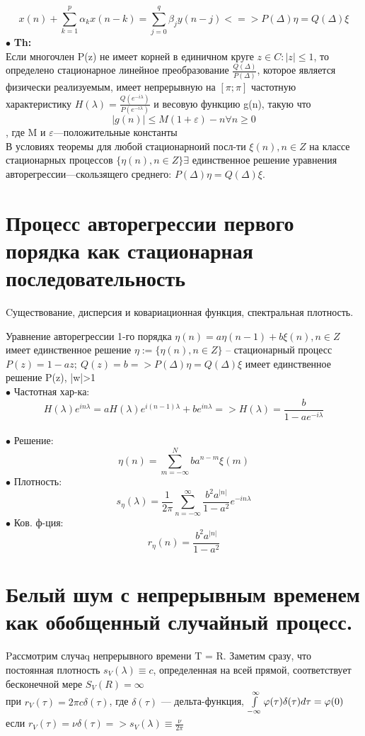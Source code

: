 \documentclass[11pt]{article}
\begin{document}
$$ x(n)+\sum_{k=1}^{p} \alpha_k x(n−k)= \sum_{j=0}^{q} \beta_j y(n−j) <=>  P(\Delta)\eta = Q(\Delta)\xi$$
$\bullet$ \textbf{Th:} \\ Если многочлен P(z) не имеет корней в единичном круге ${z \in C: |z| \leq 1}$, то определено стационарное линейное преобразование $\frac{Q(\Delta)}{P(\Delta)}$, которое является физически реализуемым, имеет непрерывную на $[\pi;\pi]$ частотную характеристику $H(\lambda) = \frac{Q(e^{−iλ})}{P(e^{−iλ})}$ и весовую функцию g(n), такую что $$|g(n)| \leq M(1+\varepsilon)−n \forall n \geq 0$$, где M и $\varepsilon$—положительные константы \\
В условиях теоремы для любой стационарноий посл-ти ${\xi(n), n \in Z}$ на классе стационарных процессов $\{\eta(n), n \in Z\} \exists$ единственное решение уравнения авторегрессии—скользящего среднего: $P(\Delta)\eta = Q(\Delta)\xi$.


\section{Процесс авторегрессии первого порядка как стационарная последовательность}
\begin{center}Cуществование, дисперсия и ковариационная функция, спектральная плотность.\end{center}
Уравнение авторегрессии 1-го порядка $\eta(n)=a \eta(n−1)+b \xi(n), n \in Z$ имеет единственное решение $\eta := \{\eta (n), n \in Z\}$ – стационарный процесс \\
$P(z) = 1 − a z;\ Q(z) = b => P(\Delta)\eta = Q(\Delta)\xi$ имеет единственное решение P(z), |w|>1 \\
$\bullet$ Частотная хар-ка: $$H(\lambda)e^{inλ} = a H(\lambda)e^{i(n−1)\lambda} + b e^{in\lambda} => H(\lambda) = \frac{b}{1-a e^{-i\lambda}}$$\\
$\bullet$ Решение: $$ \eta(n)=  \sum_{m=-\infty}^{N}ba^{n−m}\xi(m)$$
$\bullet$ Плотность: $$s_\eta(\lambda) = \frac{1}{2\pi}\sum_{n=-\infty}^{\infty} \frac{b^2a^{|n|}}{1-a^2} e^{-in\lambda}$$
$\bullet$ Ков. ф-ция:$$r_\eta(n) = \frac{b^2a^{|n|}}{1-a^2}$$


\section{Белый шум с непрерывным временем как обобщенный случайный процесс.}
Pассмотрим случаq непрерывного времени T = R. Заметим сразу, что постоянная плотность $s_V (\lambda) \equiv c$, определенная на всей прямой, соответствует бесконечной мере $S_V (R) = \infty$ \\
при $r_V (\tau) = 2\pi c\delta(\tau)$, где $\delta(\tau)$ — дельта-функция, $\int\limits_{-\infty}^{\infty} \varphi(\tau)\delta(\tau)d\tau = \varphi(0) \\$
если $r_V (\tau) = \nu\delta(\tau) => s_V (\lambda) \equiv \frac{\nu}{2\pi}$
\end{document}
